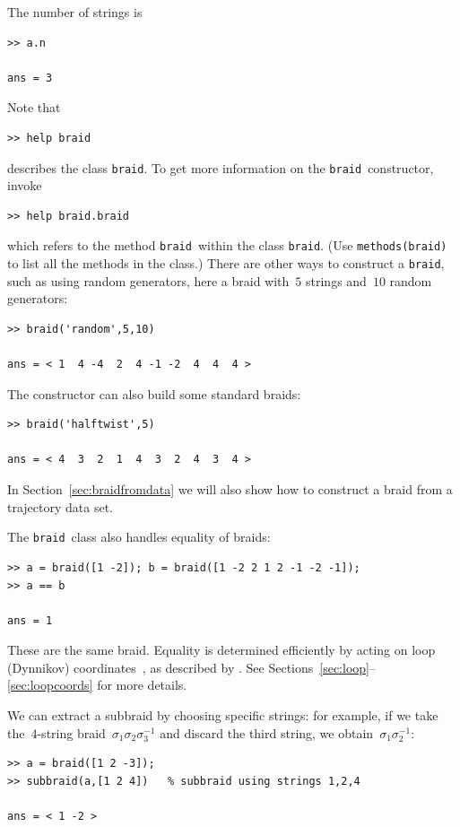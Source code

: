 \documentclass[12pt]{article}
\newcommand{\braid}{\texttt{braid}}%
\begin{document}
The number of strings is
\begin{lstlisting}[frame=single,framerule=0pt]
>> a.n

ans = 3
\end{lstlisting}
Note that
\begin{lstlisting}[frame=single,framerule=0pt]
>> help braid
\end{lstlisting}
describes the class \braid.  To get more information on the \braid\
constructor, invoke
\begin{lstlisting}[frame=single,framerule=0pt]
>> help braid.braid
\end{lstlisting}
which refers to the method \braid\ within the class \braid.  (Use
\lstinline{methods(braid)} to list all the methods in the class.)
There are other ways to construct a \braid, such as using random
generators, here a braid with~$5$ strings and~$10$ random generators:
\begin{lstlisting}[frame=single,framerule=0pt]
>> braid('random',5,10)

ans = < 1  4 -4  2  4 -1 -2  4  4  4 >
\end{lstlisting}
The constructor can also build some standard braids:
\begin{lstlisting}[frame=single,framerule=0pt]
>> braid('halftwist',5)

ans = < 4  3  2  1  4  3  2  4  3  4 >
\end{lstlisting}
In Section~\ref{sec:braidfromdata} we will also show how to construct
a braid from a trajectory data set.

The \braid\ class also handles equality of braids:
\begin{lstlisting}[frame=single,framerule=0pt]
>> a = braid([1 -2]); b = braid([1 -2 2 1 2 -1 -2 -1]);
>> a == b

ans = 1
\end{lstlisting}
These are the same braid.  Equality is determined efficiently by
acting on loop (Dynnikov) coordinates~\citep{Dynnikov2002}, as
described by \citet{Dehornoy2008}.  See
Sections~\ref{sec:loop}--\ref{sec:loopcoords} for more details.

We can extract a subbraid by choosing specific strings: for example,
if we take the~$4$-string braid~$\sigma_1\sigma_2\sigma_3^{-1}$ and
discard the third string, we obtain~$\sigma_1\sigma_2^{-1}$:
\begin{lstlisting}[frame=single,framerule=0pt]
>> a = braid([1 2 -3]);
>> subbraid(a,[1 2 4])   % subbraid using strings 1,2,4

ans = < 1 -2 >
\end{lstlisting}
\end{document}
